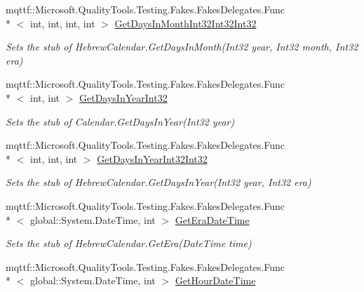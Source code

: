 \begin{DoxyCompactItemize}
mqttf\-::\-Microsoft.\-Quality\-Tools.\-Testing.\-Fakes.\-Fakes\-Delegates.\-Func\\*
$<$ int, int, int, int $>$ \hyperlink{class_system_1_1_globalization_1_1_fakes_1_1_stub_hebrew_calendar_a576114ba8527a2d9da38cedb0acb90a0}{Get\-Days\-In\-Month\-Int32\-Int32\-Int32}
\begin{DoxyCompactList}\small\item\em Sets the stub of Hebrew\-Calendar.\-Get\-Days\-In\-Month(\-Int32 year, Int32 month, Int32 era)\end{DoxyCompactList}\item 
mqttf\-::\-Microsoft.\-Quality\-Tools.\-Testing.\-Fakes.\-Fakes\-Delegates.\-Func\\*
$<$ int, int $>$ \hyperlink{class_system_1_1_globalization_1_1_fakes_1_1_stub_hebrew_calendar_a84c011727fdd4f9a8a18003640c65169}{Get\-Days\-In\-Year\-Int32}
\begin{DoxyCompactList}\small\item\em Sets the stub of Calendar.\-Get\-Days\-In\-Year(\-Int32 year)\end{DoxyCompactList}\item 
mqttf\-::\-Microsoft.\-Quality\-Tools.\-Testing.\-Fakes.\-Fakes\-Delegates.\-Func\\*
$<$ int, int, int $>$ \hyperlink{class_system_1_1_globalization_1_1_fakes_1_1_stub_hebrew_calendar_a7d3b3465c4d3d973ad24c1692dbab59f}{Get\-Days\-In\-Year\-Int32\-Int32}
\begin{DoxyCompactList}\small\item\em Sets the stub of Hebrew\-Calendar.\-Get\-Days\-In\-Year(\-Int32 year, Int32 era)\end{DoxyCompactList}\item 
mqttf\-::\-Microsoft.\-Quality\-Tools.\-Testing.\-Fakes.\-Fakes\-Delegates.\-Func\\*
$<$ global\-::\-System.\-Date\-Time, int $>$ \hyperlink{class_system_1_1_globalization_1_1_fakes_1_1_stub_hebrew_calendar_a946e20b815a47a5cf5c2349af5c2e162}{Get\-Era\-Date\-Time}
\begin{DoxyCompactList}\small\item\em Sets the stub of Hebrew\-Calendar.\-Get\-Era(\-Date\-Time time)\end{DoxyCompactList}\item 
mqttf\-::\-Microsoft.\-Quality\-Tools.\-Testing.\-Fakes.\-Fakes\-Delegates.\-Func\\*
$<$ global\-::\-System.\-Date\-Time, int $>$ \hyperlink{class_system_1_1_globalization_1_1_fakes_1_1_stub_hebrew_calendar_a9b45d72e29284166528320a6f3475f2f}{Get\-Hour\-Date\-Time}

\end{DoxyCompactItemize}

